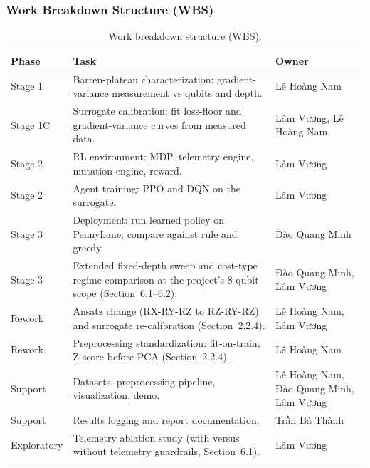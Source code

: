 \subsubsection{Work Breakdown Structure (WBS)}
\begin{table}[htbp]
\centering
\caption{Work breakdown structure (WBS).}
\label{tab:wbs}
\begin{tabular}{|p{2cm}|p{8cm}|p{3.5cm}|}
\hline
\textbf{Phase} & \textbf{Task} & \textbf{Owner} \\
\hline
Stage 1 & Barren-plateau characterization: gradient-variance measurement vs qubits and depth. & Lê Hoàng Nam \\
Stage 1C & Surrogate calibration: fit loss-floor and gradient-variance curves from measured data. & Lâm Vương, Lê Hoàng Nam \\
Stage 2 & RL environment: MDP, telemetry engine, mutation engine, reward. & Lâm Vương \\
Stage 2 & Agent training: PPO and DQN on the surrogate. & Lâm Vương \\
Stage 3 & Deployment: run learned policy on PennyLane; compare against rule and greedy. & Đào Quang Minh \\
Stage 3 & Extended fixed-depth sweep and cost-type regime comparison at the project's 8-qubit scope (Section~6.1--6.2). & Đào Quang Minh, Lâm Vương \\
Rework & Ansatz change (RX-RY-RZ to RZ-RY-RZ) and surrogate re-calibration (Section~2.2.4). & Lê Hoàng Nam, Lâm Vương \\
Rework & Preprocessing standardization: fit-on-train, Z-score before PCA (Section~2.2.4). & Lê Hoàng Nam \\
Support & Datasets, preprocessing pipeline, visualization, demo. & Lê Hoàng Nam, Đào Quang Minh, Lâm Vương \\
Support & Results logging and report documentation. & Trần Bá Thành \\
Exploratory & Telemetry ablation study (with versus without telemetry guardrails, Section~6.1). & Lâm Vương \\
\hline
\end{tabular}
\end{table}

